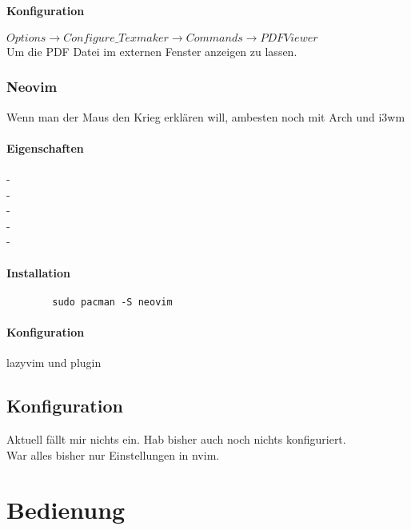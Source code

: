 \documentclass[10pt,a4paper,oneside]{report}
\begin{document}
\subsubsection{Konfiguration}
\begin{math} Options \rightarrow Configure\_Texmaker \rightarrow Commands \rightarrow PDF Viewer \end{math}\\
Um die PDF Datei im externen Fenster anzeigen zu lassen.\\
\subsection{Neovim}
Wenn man der Maus den Krieg erklären will, ambesten noch mit Arch und i3wm\\
\subsubsection{Eigenschaften}
	\hspace*{5mm} - \\
	\hspace*{5mm} - \\
	\hspace*{5mm} - \\
	\hspace*{5mm} - \\
	\hspace*{5mm} - \\
\subsubsection{Installation}
	\begin{verbatim}
		sudo pacman -S neovim
	\end{verbatim}
\subsubsection{Konfiguration}
lazyvim und plugin
\section{Konfiguration}
Aktuell fällt mir nichts ein. Hab bisher auch noch nichts konfiguriert.\\
War alles bisher nur Einstellungen in nvim.\\
\chapter{Bedienung}
\end{document}
